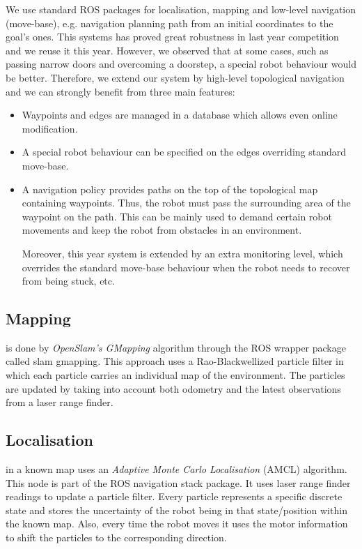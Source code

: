 We use standard ROS packages for localisation, mapping and low-level navigation (move-base), e.g. navigation planning path from an initial coordinates to the goal's ones. 
This systems has proved great robustness in last year competition and we reuse it this year. However, we observed that at some cases, such as passing narrow doors and overcoming a doorstep, a special robot behaviour would be better. 
Therefore, we extend our system by high-level topological navigation \cite{strand_top} and we can strongly benefit from three main features:
\begin{itemize}
\item Waypoints and edges are managed in a database which allows even online modification.  
\item A special robot behaviour can be specified on the edges overriding standard move-base.
\item A navigation policy \cite{bruno} provides paths on the top of the topological map containing waypoints. 
 Thus, the robot must pass the surrounding area of the waypoint on the path. This can be mainly used to demand certain robot movements and keep the robot from obstacles in an environment.
 
Moreover, this year system is extended by an extra monitoring level, which overrides the standard move-base behaviour when the robot needs to recover from being stuck, etc. 

\end{itemize}

\subsection{Mapping} is done by \textit{OpenSlam's GMapping} algorithm \cite{slam} through the ROS wrapper package called \textsf{slam gmapping}. This approach uses a Rao-Blackwellized particle filter in which each particle carries an individual map of the environment. The particles are updated by taking into account both odometry and the latest observations from a laser range finder.

\subsection{Localisation} in a known map uses an \textit{Adaptive Monte Carlo Localisation} (AMCL)\cite{amcl} algorithm. This node is part of the ROS \textsf{navigation stack} package. It uses laser range finder readings to update a particle filter. Every particle represents a specific discrete state and stores the uncertainty of the robot being in that state/position within the known map. Also, every time the robot moves it uses the motor information to shift the particles to the corresponding direction.

